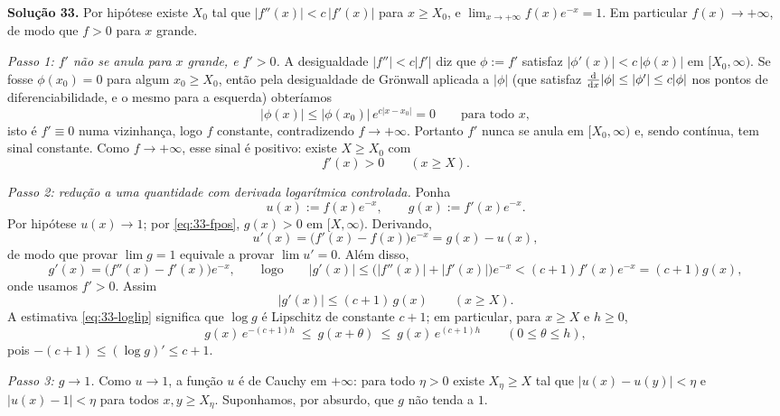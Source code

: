 \bigskip\noindent\textbf{Solução 33.}\quad
Por hipótese existe $X_0$ tal que $|f''(x)|<c\,|f'(x)|$ para $x\ge X_0$, e $\lim_{x\to+\infty}f(x)e^{-x}=1$. Em particular $f(x)\to+\infty$, de modo que $f>0$ para $x$ grande.

\emph{Passo 1: $f'$ não se anula para $x$ grande, e $f'>0$.}
A desigualdade $|f''|<c|f'|$ diz que $\phi:=f'$ satisfaz $|\phi'(x)|<c\,|\phi(x)|$ em $[X_0,\infty)$. Se fosse $\phi(x_0)=0$ para algum $x_0\ge X_0$, então pela desigualdade de Grönwall aplicada a $|\phi|$ (que satisfaz $\tfrac{\mathrm{d}}{\mathrm{d} x}|\phi|\le|\phi'|\le c|\phi|$ nos pontos de diferenciabilidade, e o mesmo para a esquerda) obteríamos
\[
|\phi(x)|\le |\phi(x_0)|\,e^{c|x-x_0|}=0\qquad\text{para todo }x,
\]
isto é $f'\equiv0$ numa vizinhança, logo $f$ constante, contradizendo $f\to+\infty$. Portanto $f'$ nunca se anula em $[X_0,\infty)$ e, sendo contínua, tem sinal constante. Como $f\to+\infty$, esse sinal é positivo: existe $X\ge X_0$ com
\begin{equation}\label{eq:33-fpos}
f'(x)>0\qquad (x\ge X).
\end{equation}

\emph{Passo 2: redução a uma quantidade com derivada logarítmica controlada.}
Ponha
\[
u(x):=f(x)e^{-x},\qquad g(x):=f'(x)e^{-x}.
\]
Por hipótese $u(x)\to1$; por \eqref{eq:33-fpos}, $g(x)>0$ em $[X,\infty)$. Derivando,
\begin{equation}\label{eq:33-rel}
u'(x)=\big(f'(x)-f(x)\big)e^{-x}=g(x)-u(x),
\end{equation}
de modo que provar $\lim g=1$ equivale a provar $\lim u'=0$. Além disso,
\[
g'(x)=\big(f''(x)-f'(x)\big)e^{-x},\qquad\text{logo}\qquad
|g'(x)|\le\big(|f''(x)|+|f'(x)|\big)e^{-x}<(c+1)f'(x)e^{-x}=(c+1)g(x),
\]
onde usamos $f'>0$. Assim
\begin{equation}\label{eq:33-loglip}
|g'(x)|\le (c+1)\,g(x)\qquad (x\ge X).
\end{equation}
A estimativa \eqref{eq:33-loglip} significa que $\log g$ é Lipschitz de constante $c+1$; em particular, para $x\ge X$ e $h\ge0$,
\begin{equation}\label{eq:33-gronwall}
g(x)\,e^{-(c+1)h}\ \le\ g(x+\theta)\ \le\ g(x)\,e^{(c+1)h}\qquad(0\le\theta\le h),
\end{equation}
pois $-(c+1)\le (\log g)'\le c+1$.

\emph{Passo 3: $g\to1$.}
Como $u\to1$, a função $u$ é de Cauchy em $+\infty$: para todo $\eta>0$ existe $X_\eta\ge X$ tal que $|u(x)-u(y)|<\eta$ e $|u(x)-1|<\eta$ para todos $x,y\ge X_\eta$. Suponhamos, por absurdo, que $g$ não tenda a $1$.

